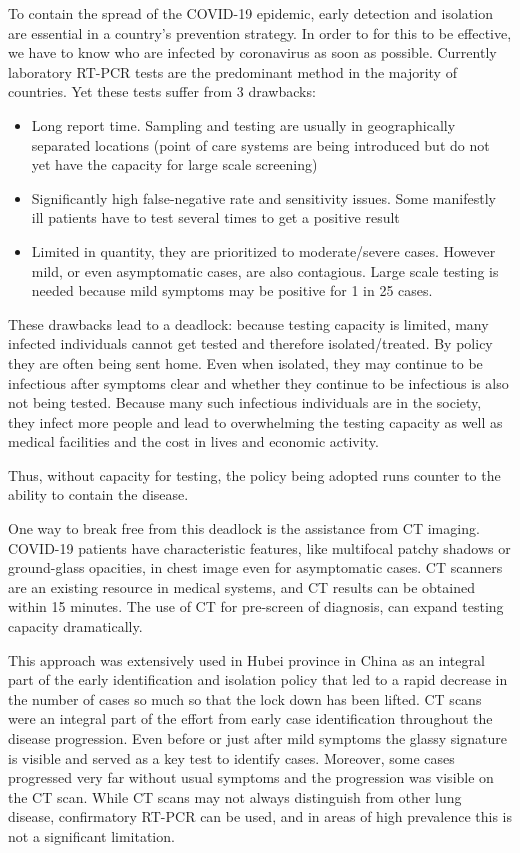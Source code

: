 \documentclass[onecolumn,journal]{IEEEtran}
\begin{document}
\begin{multicols}{2}
To contain the spread of the COVID-19 epidemic, early detection and isolation are essential in a country's prevention strategy. In order to for this to be effective, we have to know who are infected by coronavirus as soon as possible. Currently laboratory RT-PCR tests are the predominant method in the majority of countries. Yet these tests suffer from 3 drawbacks:
\begin{itemize}
    \item Long report time. Sampling and testing are usually in geographically separated locations (point of care systems are being introduced but do not yet have the capacity for large scale screening)
    \item Significantly high false-negative rate and sensitivity issues. Some manifestly ill patients have to test several times to get a positive result \cite{PCR-1, PCR-2}
    \item Limited in quantity, they are prioritized to moderate/severe cases. However mild, or even asymptomatic cases, are also contagious. Large scale testing is needed because mild symptoms may be positive for 1 in 25 cases. 
\end{itemize}

These drawbacks lead to a deadlock: because testing capacity is limited, many infected individuals cannot get tested and therefore isolated/treated. By policy they are often being sent home. Even when isolated, they may continue to be infectious after symptoms clear and whether they continue to be infectious is also not being tested. Because many such infectious individuals are in the society, they infect more people and lead to overwhelming the testing capacity as well as medical facilities and the cost in lives and economic activity. 

Thus, without capacity for testing, the policy being adopted runs counter to the ability to contain the disease. 

One way to break free from this deadlock is the assistance from CT imaging.  COVID-19 patients have characteristic features, like multifocal patchy shadows or ground-glass opacities, in chest image even for asymptomatic cases. CT scanners are an existing resource in medical systems, and CT results can be obtained within 15 minutes. The use of CT for pre-screen of diagnosis, can expand testing capacity dramatically. 

This approach was extensively used in Hubei province in China \cite{CT1,CT2,CT3} as an integral part of the early identification and isolation policy that led to a rapid decrease in the number of cases so much so that the lock down has been lifted. CT scans were an integral part of the effort from early case identification throughout the disease progression. Even before or just after mild symptoms the glassy signature is visible and served as a key test to identify cases. Moreover, some cases progressed very far without usual symptoms and the progression was visible on the CT scan. While CT scans may not always distinguish from other lung disease, confirmatory RT-PCR can be used, and in areas of high prevalence this is not a significant limitation.


\end{multicols}
\end{document}
